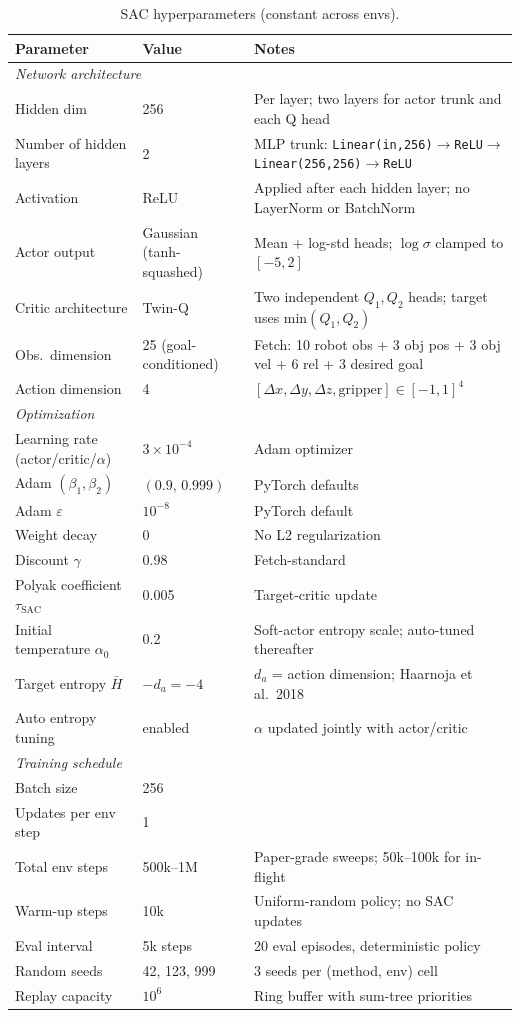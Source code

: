 \begin{table}[t]
\centering
\footnotesize
\caption{SAC hyperparameters (constant across envs).}
\label{tab:hparams-sac}
\begin{tabular}{l l l}
\toprule
Parameter & Value & Notes \\
\midrule
\multicolumn{3}{l}{\textit{Network architecture}} \\
Hidden dim & 256 & Per layer; two layers for actor trunk and each Q head \\
Number of hidden layers & 2 & MLP trunk: \texttt{Linear(in,256)}$\to$\texttt{ReLU}$\to$\texttt{Linear(256,256)}$\to$\texttt{ReLU} \\
Activation & ReLU & Applied after each hidden layer; no LayerNorm or BatchNorm \\
Actor output & Gaussian (tanh-squashed) & Mean + log-std heads; $\log\sigma$ clamped to $[-5,2]$ \\
Critic architecture & Twin-Q & Two independent $Q_1, Q_2$ heads; target uses min$(Q_1,Q_2)$ \\
Obs.\ dimension & 25 (goal-conditioned) & Fetch: 10 robot obs + 3 obj pos + 3 obj vel + 6 rel + 3 desired goal \\
Action dimension & 4 & $[\Delta x,\Delta y,\Delta z,\text{gripper}]\in[-1,1]^4$ \\
\midrule
\multicolumn{3}{l}{\textit{Optimization}} \\
Learning rate (actor/critic/$\alpha$) & $3\!\times\!10^{-4}$ & Adam optimizer \\
Adam $(\beta_1,\beta_2)$ & $(0.9,\,0.999)$ & PyTorch defaults \\
Adam $\varepsilon$ & $10^{-8}$ & PyTorch default \\
Weight decay & 0 & No L2 regularization \\
Discount $\gamma$ & 0.98 & Fetch-standard \\
Polyak coefficient $\tau_{\text{SAC}}$ & 0.005 & Target-critic update \\
Initial temperature $\alpha_0$ & 0.2 & Soft-actor entropy scale; auto-tuned thereafter \\
Target entropy $\bar{H}$ & $-d_a = -4$ & $d_a$ = action dimension; Haarnoja et al.\ 2018 \\
Auto entropy tuning & enabled & $\alpha$ updated jointly with actor/critic \\
\midrule
\multicolumn{3}{l}{\textit{Training schedule}} \\
Batch size & 256 & \\
Updates per env step & 1 & \\
Total env steps & 500k--1M & Paper-grade sweeps; 50k--100k for in-flight \\
Warm-up steps & 10k & Uniform-random policy; no SAC updates \\
Eval interval & 5k steps & 20 eval episodes, deterministic policy \\
Random seeds & 42, 123, 999 & 3 seeds per (method, env) cell \\
Replay capacity & $10^6$ & Ring buffer with sum-tree priorities \\
\bottomrule
\end{tabular}
\end{table}

